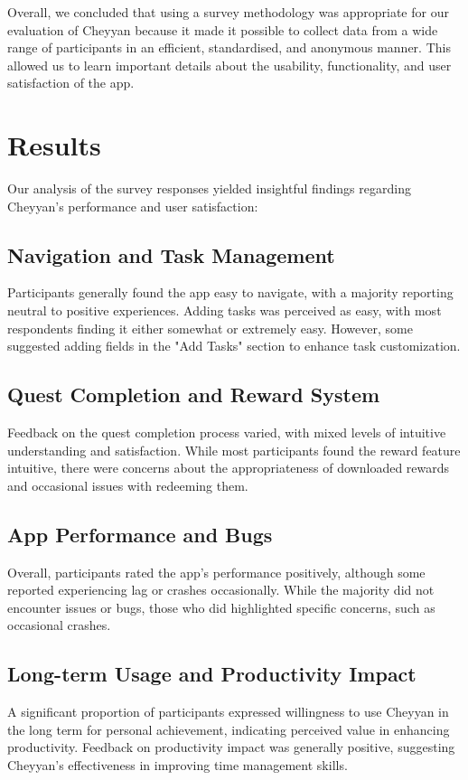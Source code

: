 \documentclass{l4proj}
\begin{document}
Overall, we concluded that using a survey methodology was appropriate for our evaluation of Cheyyan because it made it possible to collect data from a wide range of participants in an efficient, standardised, and anonymous manner. This allowed us to learn important details about the usability, functionality, and user satisfaction of the app.

\section{Results}

Our analysis of the survey responses yielded insightful findings regarding Cheyyan's performance and user satisfaction:

\subsection{Navigation and Task Management}
Participants generally found the app easy to navigate, with a majority reporting neutral to positive experiences. Adding tasks was perceived as easy, with most respondents finding it either somewhat or extremely easy. However, some suggested adding fields in the "Add Tasks" section to enhance task customization.

\subsection{Quest Completion and Reward System}
Feedback on the quest completion process varied, with mixed levels of intuitive understanding and satisfaction. While most participants found the reward feature intuitive, there were concerns about the appropriateness of downloaded rewards and occasional issues with redeeming them.

\subsection{App Performance and Bugs}
Overall, participants rated the app's performance positively, although some reported experiencing lag or crashes occasionally. While the majority did not encounter issues or bugs, those who did highlighted specific concerns, such as occasional crashes.

\subsection{Long-term Usage and Productivity Impact}
A significant proportion of participants expressed willingness to use Cheyyan in the long term for personal achievement, indicating perceived value in enhancing productivity. Feedback on productivity impact was generally positive, suggesting Cheyyan's effectiveness in improving time management skills.
\end{document}
